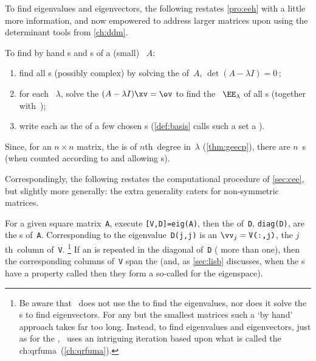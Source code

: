 To find eigenvalues and eigenvectors, the following restates \autoref{pro:eeh} with a little more information, and now empowered to address larger matrices upon using the determinant tools from \autoref{ch:ddm}.

\begin{procedure} \label{pro:geneig}
To find by hand s and s of a (small) ~\(A\):
\begin{enumerate}
\item find all s (possibly complex) by solving the  of~\(A\), \(\det(A-\lambda I)=0\)\,;
\item for each ~\(\lambda\), solve the   \((A-\lambda I)\xv=\ov\) to find the ~\(\EE_\lambda\) of all s (together with~\ov);
\item write each  as the  of a few chosen s  (\autoref{def:basis} calls such a set a ).
\end{enumerate}
Since, for an \(n\times n\) matrix, the  is of \(n\)th~degree in~\(\lambda\) (\autoref{thm:geecp}), there are \(n\)~s (when counted according to  and allowing s).
\end{procedure}

Correspondingly, the following restates the computational procedure of \autoref{sec:cee}, but slightly more generally: the extra generality caters for non-symmetric matrices.

\begin{compute}
For a given square matrix~\verb|A|, execute \verb|[V,D]=eig(A)|, then 
the  of~\verb|D|, \verb|diag(D)|, are the s of~\verb|A|. 
Corresponding to the eigenvalue~\verb|D(j,j)| is an   \(\vv_j=\verb|V(:,j)|\), the \(j\)th~column of~\verb|V|.%
\footnote{Be aware that \script\ does not use the  to find the eigenvalues, nor does it solve the s to find eigenvectors.  
For any but the smallest matrices such a `by hand' approach takes far too long.  
Instead, to find eigenvalues and eigenvectors, just as for the \svd, \script\ uses an intriguing iteration based upon what is called the \ifcsname ch:qrfuma\endcsname\ (\autoref{ch:qrfuma})\fi.}
If an  is repeated in the diagonal of~\verb|D| ( more than one), then the corresponding columns of~\verb|V| span the  
(and, as \autoref{sec:lisb} discusses, when the s have a property called  then they form a so-called  for the eigenspace). 
\end{compute}



